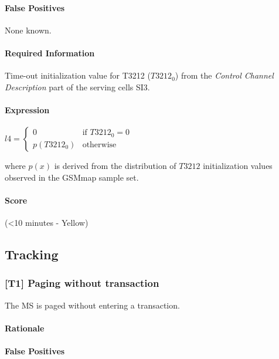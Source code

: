 \documentclass[a4paper,11pt,notitlepage,bigheadings,oneside]{scrartcl}
\begin{document}
\paragraph{False Positives}

None known.

\paragraph{Required Information}

Time-out initialization value for T3212 ($T3212_0$) from the \emph{Control
Channel Description} part of the serving cells SI3.

\paragraph{Expression}

$l4 =
\begin{cases}
	0 	 	& \text{if } T3212_0 = 0 \\
	p(T3212_0) 	& \text{otherwise}
\end{cases}$

where $p(x)$ is derived from the distribution of $T3212$ initialization values
observed in the GSMmap sample set. 

\paragraph{Score}

\TBD{} (\textless 10 minutes - Yellow)

\subsection{Tracking}

\subsubsection{[T1] Paging without transaction}

The MS is paged without entering a transaction.

\paragraph{Rationale}

\TBD{}

\paragraph{False Positives}
\end{document}
